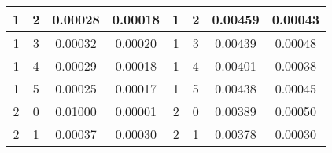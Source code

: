 \begin{table}[H]
\begin{tabular}{|c|c|c|c|c|c|c|c|}
1                                      & 2                                      & 0.00028                                                             & 0.00018                                                                 & 1                                      & 2                                     & 0.00459                                                             & 0.00043                                                                 \\ \hline
1                                      & 3                                      & 0.00032                                                             & 0.00020                                                                 & 1                                      & 3                                     & 0.00439                                                             & 0.00048                                                                 \\ \hline
1                                      & 4                                      & 0.00029                                                             & 0.00018                                                                 & 1                                      & 4                                     & 0.00401                                                             & 0.00038                                                                 \\ \hline
1                                      & 5                                      & 0.00025                                                             & 0.00017                                                                 & 1                                      & 5                                     & 0.00438                                                             & 0.00045                                                                 \\ \hline
2                                      & 0                                      & 0.01000                                                             & 0.00001                                                                 & 2                                      & 0                                     & 0.00389                                                             & 0.00050                                                                 \\ \hline
2                                      & 1                                      & 0.00037                                                             & 0.00030                                                                 & 2                                      & 1                                     & 0.00378                                                             & 0.00030                                                                 \\ \hline

\end{tabular}
\end{table}
